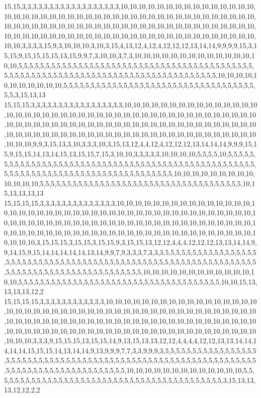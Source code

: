 15,15,3,3,3,3,3,3,3,3,3,3,3,3,3,3,3,3,3,3,10,10,10,10,10,10,10,10,10,10,10,10,10,10,10,10,10,10,10,10,10,10,10,10,10,10,10,10,10,10,10,10,10,10,10,10,10,10,10,10,10,10,10,10,10,10,10,10,10,10,10,10,10,10,10,10,10,10,10,10,10,10,10,10,10,10,10,10,10,10,10,10,10,10,10,10,10,10,10,10,10,10,10,10,10,10,10,10,10,10,10,10,10,10,10,10,10,10,10,10,10,3,3,3,3,15,9,3,10,10,10,3,10,3,15,4,13,12,4,12,4,12,12,12,13,14,14,9,9,9,9,15,3,15,15,9,15,15,15,15,13,15,9,9,7,3,10,10,3,7,3,10,10,10,10,10,10,10,10,10,10,10,10,10,10,10,5,5,5,5,5,5,5,5,5,5,5,5,5,5,5,5,5,5,5,5,5,5,5,5,5,5,5,5,5,5,5,5,5,5,5,5,5,5,5,5,5,5,5,5,5,5,5,5,5,5,5,5,5,5,5,5,5,5,5,5,5,5,5,5,5,5,5,5,5,5,5,5,5,5,5,5,5,5,5,5,5,5,10,10,10,10,10,10,10,10,10,10,10,5,5,5,5,5,5,5,5,5,5,5,5,5,5,5,5,5,5,5,5,5,5,5,5,5,5,5,5,5,5,5,5,5,5,5,5,5,3,15,13,13
15,15,15,3,3,3,3,3,3,3,3,3,3,3,3,3,3,3,3,3,10,10,10,10,10,10,10,10,10,10,10,10,10,10,10,10,10,10,10,10,10,10,10,10,10,10,10,10,10,10,10,10,10,10,10,10,10,10,10,10,10,10,10,10,10,10,10,10,10,10,10,10,10,10,10,10,10,10,10,10,10,10,10,10,10,10,10,10,10,10,10,10,10,10,10,10,10,10,10,10,10,10,10,10,10,10,10,10,10,10,10,10,10,10,10,10,10,10,10,10,10,10,9,9,3,15,13,3,10,3,3,3,10,3,15,13,12,4,4,12,4,12,12,12,13,14,14,14,9,9,9,15,15,9,15,15,14,13,14,15,13,15,15,7,15,3,10,10,3,3,3,3,3,10,10,10,10,5,5,5,5,10,5,5,5,5,5,5,5,5,5,5,5,5,5,5,5,5,5,5,5,5,5,5,5,5,5,5,5,5,5,5,5,5,5,5,5,5,5,5,5,5,5,5,5,5,5,5,5,5,5,5,5,5,5,5,5,5,5,5,5,5,5,5,5,5,5,5,5,5,5,5,5,5,5,5,5,5,5,5,5,5,5,5,10,10,10,10,10,10,10,10,10,10,10,10,10,5,5,5,5,5,5,5,5,5,5,5,5,5,5,5,5,5,5,5,5,5,5,5,5,5,5,5,5,5,5,5,5,5,5,5,5,5,10,15,13,13,13,13
15,15,15,15,3,3,3,3,3,3,3,3,3,3,3,3,3,3,10,10,10,10,10,10,10,10,10,10,10,10,10,10,10,10,10,10,10,10,10,10,10,10,10,10,10,10,10,10,10,10,10,10,10,10,10,10,10,10,10,10,10,10,10,10,10,10,10,10,10,10,10,10,10,10,10,10,10,10,10,10,10,10,10,10,10,10,10,10,10,10,10,10,10,10,10,10,10,10,10,10,10,10,10,10,10,10,10,10,10,10,10,10,10,10,10,10,10,10,10,10,10,3,15,15,15,3,15,15,3,15,15,9,3,15,15,13,12,12,4,4,4,12,12,12,13,13,14,14,9,9,14,15,9,15,14,14,14,14,14,13,14,9,9,7,9,3,3,3,7,3,3,3,5,5,5,5,5,5,5,5,5,5,5,5,5,5,5,5,5,5,5,5,5,5,5,5,5,5,5,5,5,5,5,5,5,5,5,5,5,5,5,5,5,5,5,5,5,5,5,5,5,5,5,5,5,5,5,5,5,5,5,5,5,5,5,5,5,5,5,5,5,5,5,5,5,5,5,5,5,5,5,5,5,5,5,5,5,5,5,5,10,10,10,10,10,10,10,10,10,10,10,10,10,10,5,5,5,5,5,5,5,5,5,5,5,5,5,5,5,5,5,5,5,5,5,5,5,5,5,5,5,5,5,5,5,5,5,5,5,5,5,10,10,15,13,13,13,13,12,2
15,15,15,15,3,3,3,3,3,3,3,3,3,3,3,3,10,10,10,10,10,10,10,10,10,10,10,10,10,10,10,10,10,10,10,10,10,10,10,10,10,10,10,10,10,10,10,10,10,10,10,10,10,10,10,10,10,10,10,10,10,10,10,10,10,10,10,10,10,10,10,10,10,10,10,10,10,10,10,10,10,10,10,10,10,10,10,10,10,10,10,10,10,10,10,10,10,10,10,10,10,10,10,10,10,10,10,10,10,10,10,10,10,10,10,10,10,10,10,10,3,3,3,9,15,15,15,13,15,15,14,9,13,15,13,13,12,12,4,4,4,4,12,12,13,13,14,14,14,14,14,15,15,15,14,13,14,14,9,13,9,9,9,7,7,3,3,9,9,9,3,5,5,5,5,5,5,5,5,5,5,5,5,5,5,5,5,5,5,5,5,5,5,5,5,5,5,5,5,5,5,5,5,5,5,5,5,5,5,5,5,5,5,5,5,5,5,5,5,5,5,5,5,5,5,5,5,5,5,5,5,5,5,5,5,5,5,5,5,5,5,5,5,5,5,5,5,5,5,5,5,5,5,5,5,5,10,10,10,10,10,10,10,10,10,10,10,10,10,5,5,5,5,5,5,5,5,5,5,5,5,5,5,5,5,5,5,5,5,5,5,5,5,5,5,5,5,5,5,5,5,5,5,5,5,5,5,5,5,5,5,3,15,13,13,13,12,12,2,2
